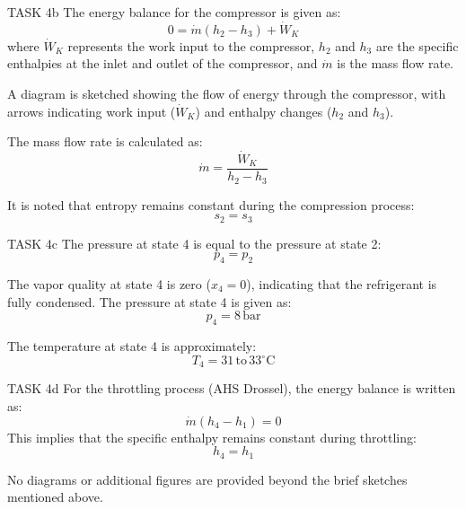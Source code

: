 TASK 4b  
The energy balance for the compressor is given as:  
\[
0 = \dot{m} (h_2 - h_3) + \dot{W}_K
\]  
where \( \dot{W}_K \) represents the work input to the compressor, \( h_2 \) and \( h_3 \) are the specific enthalpies at the inlet and outlet of the compressor, and \( \dot{m} \) is the mass flow rate.  

A diagram is sketched showing the flow of energy through the compressor, with arrows indicating work input (\( \dot{W}_K \)) and enthalpy changes (\( h_2 \) and \( h_3 \)).  

The mass flow rate is calculated as:  
\[
\dot{m} = \frac{\dot{W}_K}{h_2 - h_3}
\]  

It is noted that entropy remains constant during the compression process:  
\[
s_2 = s_3
\]  

TASK 4c  
The pressure at state 4 is equal to the pressure at state 2:  
\[
p_4 = p_2
\]  

The vapor quality at state 4 is zero (\( x_4 = 0 \)), indicating that the refrigerant is fully condensed. The pressure at state 4 is given as:  
\[
p_4 = 8 \, \text{bar}
\]  

The temperature at state 4 is approximately:  
\[
T_4 = 31 \, \text{to} \, 33^\circ\text{C}
\]  

TASK 4d  
For the throttling process (AHS Drossel), the energy balance is written as:  
\[
\dot{m} (h_4 - h_1) = 0
\]  
This implies that the specific enthalpy remains constant during throttling:  
\[
h_4 = h_1
\]  

No diagrams or additional figures are provided beyond the brief sketches mentioned above.